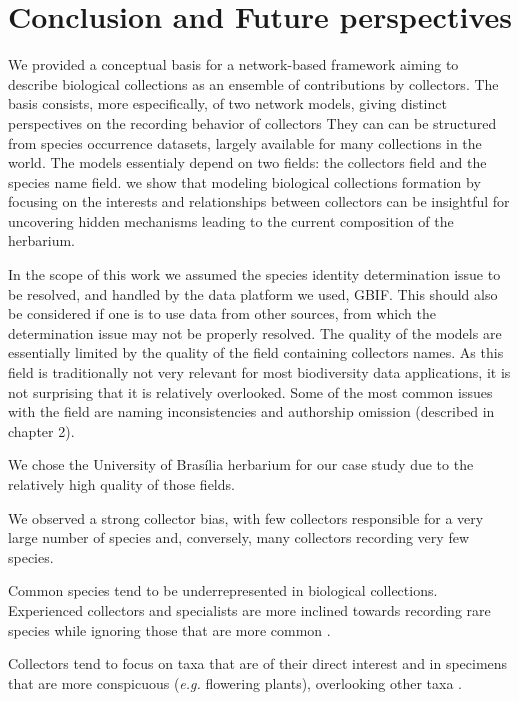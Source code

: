 \chapter{Conclusion and Future perspectives}\label{conclusion_perspectives}


We provided a conceptual basis for a network-based framework aiming to describe biological collections as an ensemble of contributions by collectors.
The basis consists, more especifically, of two network models, giving distinct perspectives on the recording behavior of collectors
They can can be structured from species occurrence datasets, largely available for many collections in the world.
The models essentialy depend on two fields: the collectors field and the species name field.
we show that modeling biological collections formation by focusing on the interests and relationships between collectors can be insightful for uncovering hidden mechanisms leading to the current composition of the herbarium. 

In the scope of this work we assumed the species identity determination issue to be resolved, and handled by the data platform we used, GBIF. 
This should also be considered if one is to use data from other sources, from which the determination issue may not be properly resolved.
The quality of the models are essentially limited by the quality of the field containing collectors names.
As this field is traditionally not very relevant for most biodiversity data applications, it is not surprising that it is relatively overlooked.
Some of the most common issues with the field are naming inconsistencies and authorship omission (described in chapter 2).



We chose the University of Brasília herbarium for our case study due to the relatively high quality of those fields.

We observed a strong collector bias, with few collectors responsible for a very large number of species and, conversely, many collectors recording very few species.

Common species tend to be underrepresented in biological collections.
Experienced collectors and specialists are more inclined towards recording rare species while ignoring those that are more common \cite{Nelson1990}.

Collectors tend to focus on taxa that are of their direct interest and in specimens that are more conspicuous (\textit{e.g.} flowering plants), overlooking other taxa \cite{VanGemerden2005}.




